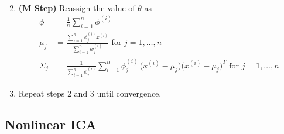 \begin{definition}
\begin{enumerate}
\begin{align*}
        \end{align*}
      \item \textbf{(M Step)} Reassign the value of $\theta$ as 
        \begin{align*} 
          \phi & = \frac{1}{n} \sum_{i=1}^n \phi^{(i)} \\
          \mu_j & = \frac{\sum_{i=1}^n \phi_j^{(i)} x^{(i)}}{\sum_{i=1}^n w_j^{(i)}} \text{ for } j = 1, \ldots, n \\
          \Sigma_j & = \frac{1}{\sum_{i=1}^n \phi_j^{(i)}} \sum_{i=1}^n \phi^{(i)}_j \, \big(x^{(i)} - \mu_j \big) \big(x^{(i)} - \mu_j\big)^T \text{ for } j = 1, \ldots, n 
        \end{align*}
      \item Repeat steps 2 and 3 until convergence.
    \end{enumerate}
  \end{definition}

\subsection{Nonlinear ICA} 
